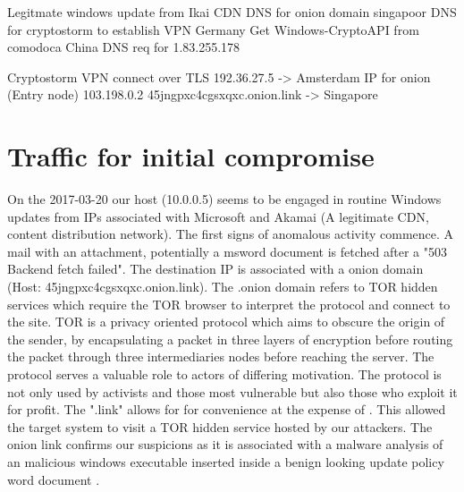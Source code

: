 \documentclass[11pt]{diazessay} %
\begin{document}
Legitmate windows update from Ikai CDN 
DNS for onion domain singapoor 
DNS for cryptostorm to establish VPN Germany
Get Windows-CryptoAPI from comodoca 
China DNS req  for 1.83.255.178 

Cryptostorm VPN connect over TLS 
192.36.27.5 -> Amsterdam IP for onion (Entry node)
103.198.0.2     45jngpxc4cgsxqxc.onion.link -> Singapore


\section{Traffic for initial compromise}

On the 2017-03-20 our host (10.0.0.5) seems to be engaged in routine Windows updates from IPs associated with Microsoft and Akamai (A legitimate CDN, content distribution network). The first signs of anomalous activity commence. A mail with an attachment, potentially a msword document is fetched after a "503 Backend fetch failed". The destination IP is associated with a onion domain (Host: 45jngpxc4cgsxqxc.onion.link). The .onion domain refers to TOR hidden services which require the TOR browser to interpret the protocol and connect to the site. TOR is a privacy oriented protocol which aims to obscure the origin of the sender, by encapsulating a packet in three layers of encryption before routing the packet through three intermediaries nodes before reaching the server. The protocol serves a valuable role to actors of differing motivation. The protocol is not only used by activists and those most vulnerable but also those who exploit it for profit. The ".link" allows for for convenience at the expense of \cite{onionlink}. This allowed the target system to visit a TOR hidden service hosted by our attackers. The onion link confirms our suspicions as it is associated with a malware analysis of an malicious windows executable inserted inside a benign looking update policy word document \cite{hybrid}.
\end{document}
